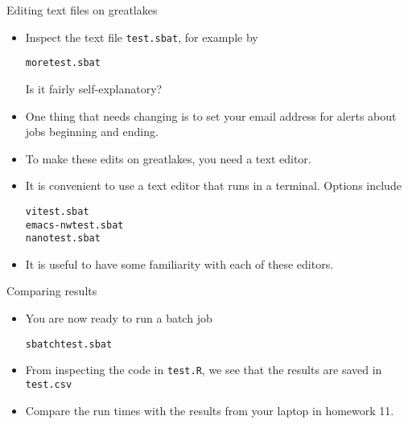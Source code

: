 \begin{frame}[fragile]{Editing text files on greatlakes}

\begin{itemize}
\item Inspect the text file \texttt{test.sbat}, for example by
\begin{knitrout}\small
{}\color{fgcolor}\begin{kframe}
\begin{alltt}
more test.sbat
\end{alltt}
\end{kframe}
\end{knitrout}
Is it fairly self-explanatory?
\item One thing that needs changing is to set your email address for alerts about jobs beginning and ending. 
\item To make these edits on greatlakes, you need a text editor.
\item It is convenient to use a text editor that runs in a terminal. Options include
\begin{knitrout}\small
{}\color{fgcolor}\begin{kframe}
\begin{alltt}
vi test.sbat
emacs -nw test.sbat
nano test.sbat
\end{alltt}
\end{kframe}
\end{knitrout}
\item It is useful to have some familiarity with each of these editors.
\end{itemize}

\end{frame}

\begin{frame}[fragile]{Comparing results}

\begin{itemize}
\item You are now ready to run a batch job
\begin{knitrout}\small
{}\color{fgcolor}\begin{kframe}
\begin{alltt}
sbatch test.sbat
\end{alltt}
\end{kframe}
\end{knitrout}
\item
From inspecting the code in \texttt{test.R}, we see that the results are saved in \texttt{test.csv}
\item
Compare the run times with the results from your laptop in homework 11.
\end{itemize}

\end{frame}

